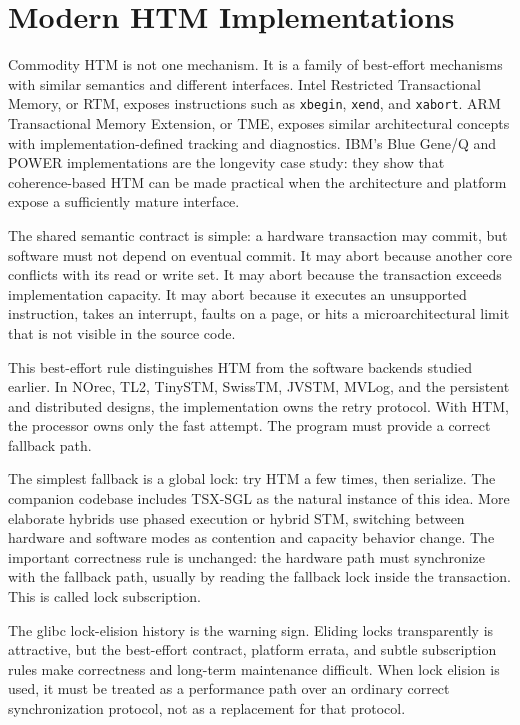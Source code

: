 \section{Modern HTM Implementations}

Commodity HTM is not one mechanism. It is a family of best-effort mechanisms with similar semantics and different interfaces. Intel Restricted Transactional Memory, or RTM, exposes instructions such as \texttt{xbegin}, \texttt{xend}, and \texttt{xabort}. ARM Transactional Memory Extension, or TME, exposes similar architectural concepts with implementation-defined tracking and diagnostics. IBM's Blue Gene/Q and POWER implementations are the longevity case study: they show that coherence-based HTM can be made practical when the architecture and platform expose a sufficiently mature interface.

The shared semantic contract is simple: a hardware transaction may commit, but software must not depend on eventual commit. It may abort because another core conflicts with its read or write set. It may abort because the transaction exceeds implementation capacity. It may abort because it executes an unsupported instruction, takes an interrupt, faults on a page, or hits a microarchitectural limit that is not visible in the source code.

This best-effort rule distinguishes HTM from the software backends studied earlier. In NOrec, TL2, TinySTM, SwissTM, JVSTM, MVLog, and the persistent and distributed designs, the implementation owns the retry protocol. With HTM, the processor owns only the fast attempt. The program must provide a correct fallback path.

The simplest fallback is a global lock: try HTM a few times, then serialize. The companion codebase includes TSX-SGL as the natural instance of this idea. More elaborate hybrids use phased execution or hybrid STM, switching between hardware and software modes as contention and capacity behavior change. The important correctness rule is unchanged: the hardware path must synchronize with the fallback path, usually by reading the fallback lock inside the transaction. This is called lock subscription.

The glibc lock-elision history is the warning sign. Eliding locks transparently is attractive, but the best-effort contract, platform errata, and subtle subscription rules make correctness and long-term maintenance difficult. When lock elision is used, it must be treated as a performance path over an ordinary correct synchronization protocol, not as a replacement for that protocol.


